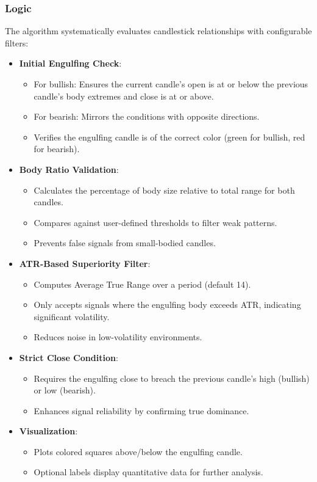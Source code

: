 \documentclass[12pt]{article}
\begin{document}
\subsubsection{Logic}
The algorithm systematically evaluates candlestick relationships with configurable filters:
\begin{itemize}
\item \textbf{Initial Engulfing Check}:
  \begin{itemize}
  \item For bullish: Ensures the current candle's open is at or below the previous candle's body extremes and close is at or above.
  \item For bearish: Mirrors the conditions with opposite directions.
  \item Verifies the engulfing candle is of the correct color (green for bullish, red for bearish).
  \end{itemize}
\item \textbf{Body Ratio Validation}:
  \begin{itemize}
  \item Calculates the percentage of body size relative to total range for both candles.
  \item Compares against user-defined thresholds to filter weak patterns.
  \item Prevents false signals from small-bodied candles.
  \end{itemize}
\item \textbf{ATR-Based Superiority Filter}:
  \begin{itemize}
  \item Computes Average True Range over a period (default 14).
  \item Only accepts signals where the engulfing body exceeds ATR, indicating significant volatility.
  \item Reduces noise in low-volatility environments.
  \end{itemize}
\item \textbf{Strict Close Condition}:
  \begin{itemize}
  \item Requires the engulfing close to breach the previous candle's high (bullish) or low (bearish).
  \item Enhances signal reliability by confirming true dominance.
  \end{itemize}
\item \textbf{Visualization}:
  \begin{itemize}
  \item Plots colored squares above/below the engulfing candle.
  \item Optional labels display quantitative data for further analysis.
  \end{itemize}
\end{itemize}
\end{document}
